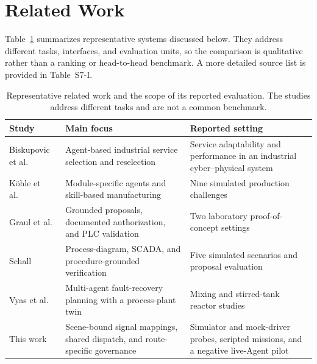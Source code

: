 \section{Related Work}
\label{sec:related}
Table~\ref{tab:related-comparison} summarizes representative systems discussed below. They address different tasks, interfaces, and evaluation units, so the comparison is qualitative rather than a ranking or head-to-head benchmark. A more detailed source list is provided in Table~S7-I.

\begin{table}[!t]
\centering
\caption{Representative related work and the scope of its reported evaluation. The studies address different tasks and are not a common benchmark.}
\label{tab:related-comparison}
\footnotesize
\setlength{\tabcolsep}{5pt}
\begin{tabularx}{\textwidth}{@{}>{\raggedright\arraybackslash}p{}>{\raggedright\arraybackslash}p{}X@{}}
\toprule
Study & Main focus & Reported setting \\
\midrule
Biskupovic et al.~\cite{biskupovic2025supervision} & Agent-based industrial service selection and reselection & Service adaptability and performance in an industrial cyber--physical system \\
K\"{o}hle et al.~\cite{koehle2026llmdriven} & Module-specific agents and skill-based manufacturing & Nine simulated production challenges \\
Graul et al.~\cite{graul2026aas} & Grounded proposals, documented authorization, and PLC validation & Two laboratory proof-of-concept settings \\
Schall~\cite{schall2026safe} & Process-diagram, SCADA, and procedure-grounded verification & Five simulated scenarios and proposal evaluation \\
Vyas et al.~\cite{vyas2026detection} & Multi-agent fault-recovery planning with a process-plant twin & Mixing and stirred-tank reactor studies \\
This work & Scene-bound signal mappings, shared dispatch, and route-specific governance & Simulator and mock-driver probes, scripted missions, and a negative live-Agent pilot \\
\bottomrule
\end{tabularx}
\end{table}

